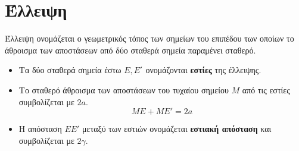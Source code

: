 \section{Έλλειψη}
\orismoi
{}
Έλλειψη ονομάζεται ο γεωμετρικός τόπος των σημείων του επιπέδου των οποίων το άθροισμα των αποστάσεων από δύο σταθερά σημεία παραμένει σταθερό.
\begin{itemize}[itemsep=0mm]
\item Τα δύο σταθερά σημεία έστω $ E, E΄ $ ονομάζονται \textbf{εστίες} της έλλειψης.
\item Το σταθερό άθροισμα των αποστάσεων του τυχαίου σημείου $ M $ από τις εστίες συμβολίζεται με $ 2a $.
\[ ME+ME'=2a \]
\item Η απόσταση $ EE' $ μεταξύ των εστιών ονομάζεται \textbf{εστιακή απόσταση} και συμβολίζεται με $ 2\gamma $.
\end{itemize}
